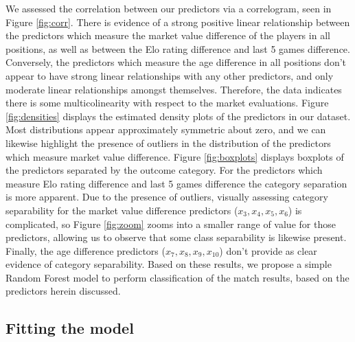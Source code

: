 \documentclass[12pt,paper=letter,leqno]{scrartcl}
\begin{document}
We assessed the correlation between our predictors via a correlogram, seen in Figure \ref{fig:corr}. There is evidence of a strong positive linear relationship between the predictors which measure the market value difference of the players in all positions, as well as between the Elo rating difference and last 5 games difference. Conversely, the predictors which measure the age difference in all positions don't appear to have strong linear relationships with any other predictors, and only moderate linear relationships amongst themselves. Therefore, the data indicates there is some multicolinearity with respect to the market evaluations. Figure \ref{fig:densities} displays the estimated density plots of the predictors in our dataset. Most distributions appear approximately symmetric about zero, and we can likewise highlight the presence of outliers in the distribution of the predictors which measure market value difference. Figure \ref{fig:boxplots} displays boxplots of the predictors separated by the outcome category. For the predictors which measure Elo rating difference and last 5 games difference the category separation is more apparent. Due to the presence of outliers, visually assessing category separability for the market value difference predictors ($x_3,x_4,x_5,x_6$) is complicated, so Figure \ref{fig:zoom} zooms into a smaller range of value for those predictors, allowing us to observe that some class separability is likewise present. Finally, the age difference predictors ($x_7,x_8,x_9,x_{10}$) don't provide as clear evidence of category separability. Based on these results, we propose a simple Random Forest model to perform classification of the match results, based on the predictors herein discussed.

\subsection{Fitting the model}
\end{document}
